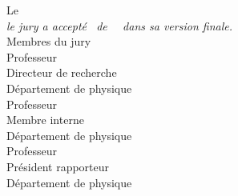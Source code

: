 \begin{comment}
\end{comment}
\makeatletter   %

\newpage
\thispagestyle{empty}
\begin{center}
    \vglue 2cm
    Le \underline{\hspace{5cm}} 
    \\[2cm]
    \scalebox{1} %
    {\it le jury a accepté \leDocument\ de \monsieurMadame~\@author~dans sa version finale.} 
    \\[2cm]
    Membres du jury\\[2cm]

    Professeur \underline{\hspace{2.5cm}}\\
    Directeur de recherche\\
    Département de physique\\[2cm]
    
    Professeur \underline{\hspace{2.5cm}}\\
    Membre interne\\
    Département de physique\\[2cm]

    Professeur \underline{\hspace{2.5cm}}\\
    Président rapporteur\\
    Département de physique\\[2cm]
\end{center}

\makeatother    %
